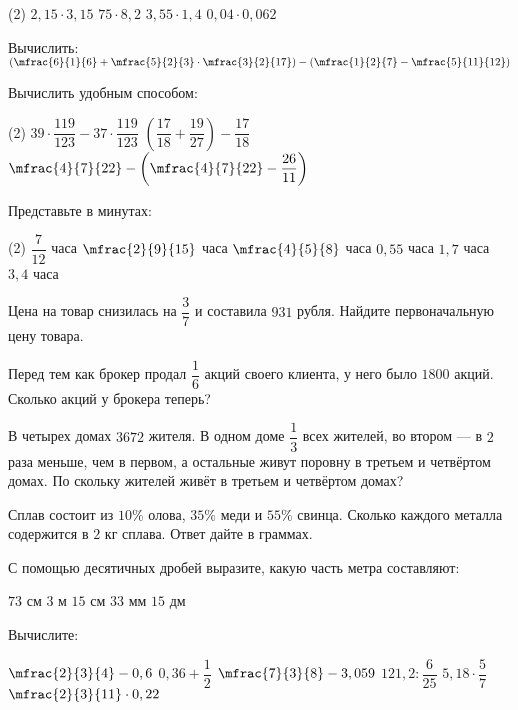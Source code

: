 \begin{class}[number=7-8]
\begin{listofex}
		\begin{tasks}(2)
			\task \( 2,15\cdot3,15 \)
			\task \( 75\cdot8,2 \)
			\task \( 3,55\cdot1,4 \)
			\task \( 0,04\cdot0,062 \)
		\end{tasks}
		\item Вычислить: \( \left( \mfrac{6}{1}{6} + \mfrac{5}{2}{3} \cdot \mfrac{3}{2}{17} \right) - \left( \mfrac{1}{2}{7} - \mfrac{5}{11}{12} \right) \)
		\item Вычислить удобным способом:
		\begin{tasks}(2)
			\task \( 39 \cdot \dfrac{119}{123} - 37 \cdot \dfrac{119}{123} \)
			\task \( \left( \dfrac{17}{18} + \dfrac{19}{27} \right) - \dfrac{17}{18} \)
			\task \( \mfrac{4}{7}{22} - \left( \mfrac{4}{7}{22} - \dfrac{26}{11} \right) \)
		\end{tasks}
		\item Представьте в минутах:
		\begin{tasks}(2)
			\task \( \dfrac{7}{12} \) часа
			\task \( \mfrac{2}{9}{15} \) часа
			\task \( \mfrac{4}{5}{8} \) часа
			\task \( 0,55 \) часа
			\task \( 1,7 \) часа
			\task \( 3,4 \) часа
		\end{tasks}
	\end{listofex}
\end{class}

\begin{homework}[number=1]
	\begin{listofex}
		\item Цена на товар снизилась на \(\dfrac{3}{7}\) и составила \(931\) рубля. Найдите первоначальную цену товара.
		\item Перед тем как брокер продал \( \dfrac{1}{6} \) акций своего клиента, у него было \(1800\) акций. Сколько акций у брокера теперь?
		\item В четырех домах \(3672\) жителя. В одном доме \(\dfrac{1}{3}\) всех жителей, во втором --- в \(2\) раза меньше, чем в первом, а остальные живут поровну в третьем и четвёртом домах. По скольку жителей живёт в третьем и четвёртом домах?
		\item Сплав состоит из \(10 \%\) олова, \(35\%\) меди и \(55\%\) свинца. Сколько каждого металла содержится в \(2\) кг сплава. Ответ дайте в граммах.
		\item С помощью десятичных дробей выразите, какую часть метра составляют:
		\begin{itasks}[4]
			\task \(73\) см
			\task \(3\) м \(15\) см
			\task \(33\) мм
			\task \(15\) дм
		\end{itasks}
		\item Вычислите:
		\begin{itasks}[3]
			\task \(\mfrac{2}{3}{4}-0,6\) 
			\task \( 0,36+\dfrac{1}{2} \)
			\task \(\mfrac{7}{3}{8}-3,059\)
			\task \(121,2:\dfrac{6}{25}\)
			\task \( 5,18 \cdot \dfrac{5}{7} \) 
			\task \( \mfrac{2}{3}{11} \cdot 0,22 \)
		\end{itasks}
	\end{listofex}
\end{homework}

